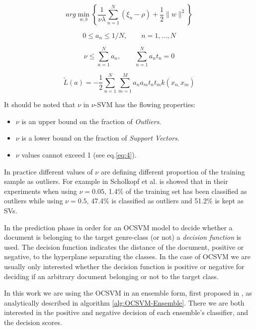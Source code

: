 \begin{equation}\label{eq:3}
	arg\min_{w,b}\left\{ \frac{1}{\nu\lambda}\sum_{n=1}^{N}(\xi_{n}-\rho)+\frac{1}{2}\|w\|^{2}\right\}
\end{equation}

\begin{equation}\label{eq:4}
	0\leqslant a_{n}\leqslant1/N,\qquad n=1,...,N
\end{equation}

\begin{equation}\label{eq:5}
	\nu\leqslant\sum_{n=1}^{N}a_{n}, \qquad \sum_{n=1}^{N}a_{n}t_{n}=0
\end{equation}

\begin{equation}\label{eq:12}
	\widetilde{L}(a)=-\frac{1}{2}\sum_{n=1}^{N}\sum_{m=1}^{M}a_{n}a_{m}t_{n}t_{m}k(x_{n,}x_{m})
\end{equation}

\newpage


It should be noted that $\nu$ in $\nu$-SVM has the flowing properties:
\begin{itemize}
	\item $\nu$ is an upper bound on the fraction of \textit{Outliers}.
	\item $\nu$ is a lower bound on the fraction of \textit{Support Vectors}.
	\item $\nu$ values cannot exceed 1 (see eq.\ref{eq:4}).
\end{itemize}

In practice different values of $\nu$ are defining different proportion of the training sample as outliers. For example in Scholkopf et al. \citep{scholkopf1999estimating} is showed that in their experiments when using $\nu=0.05$, 1.4\% of the training set has been classified as outliers while using $\nu=0.5$, 47.4\% is classified as outliers and 51.2\% is kept as SVs.

In the prediction phase in order for an OCSVM model to decide whether a document is belonging to the target genre-class (or not) a \textit{decision function} is used. The decision function indicates the distance of the document, positive or negative, to the hyperplane separating the classes. In the case of OCSVM we are usually only interested whether the decision function is positive or negative for deciding if an arbitrary document belonging or not to the target class.

In this work we are using the OCSVM in an ensemble form, first proposed in \citep{pritsos2013open}, as analytically described in algorithm \ref{alg:OCSVM-Ensemble}. There we are both interested in the positive and negative decision of each ensemble's classifier, and the decision scores.

